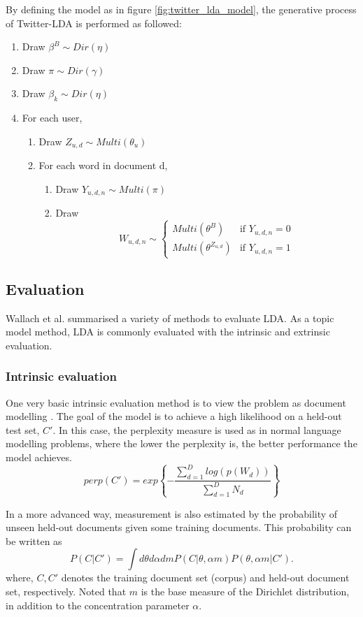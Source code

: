 \documentclass[11pt]{article}
\begin{document}
By defining the model as in figure \ref{fig:twitter_lda_model}, the generative process of Twitter-LDA is performed as followed:
\begin{enumerate}
	\item Draw $\beta^B \sim Dir(\eta)$
	\item Draw $\pi \sim Dir(\gamma)$
	\item Draw $\beta_k \sim Dir(\eta)$
	\item For each user,
	\begin{enumerate}
		\item Draw $Z_{u,d} \sim Multi(\theta_u)$
		\item For each word in document d,
		\begin{enumerate}
			\item Draw $Y_{u,d,n} \sim Multi(\pi)$
			\item Draw \[W_{u,d,n} \sim 
			\begin{cases}
			Multi(\theta^B) & \text{if $Y_{u,d,n} = 0$}\\
			Multi(\theta^{Z_{u,d}}) & \text{if $Y_{u,d,n} = 1$}
			\end{cases}\]
		\end{enumerate}
	\end{enumerate}
\end{enumerate}

\subsection{Evaluation} \label{evaluation}

Wallach et al. \cite{Wallach2009a} summarised a variety of methods to evaluate LDA. As a topic model method, LDA is commonly evaluated with the intrinsic and extrinsic evaluation. 

\subsubsection{Intrinsic evaluation}
One very basic intrinsic evaluation method is to view the problem as document modelling \cite{Blei2003}. The goal of the model is to achieve a high likelihood on a held-out test set, $C'$. In this case, the perplexity measure is used as in normal language modelling problems, where the lower the perplexity is, the better performance the model achieves.
\[perp(C')=exp\left\{-\frac{\sum_{d=1}^{D}{log(p(W_d))}}{\sum_{d=1}^{D}N_d}\right\}\]

In a more advanced way, measurement is also estimated by the probability of unseen held-out documents given some training documents. This probability can be written as
\cite{Wallach2009a}
\[P(C|C')=\int d\theta d\alpha dm P(C|\theta,\alpha m)P(\theta,\alpha m|C').\]
where, $C, C'$ denotes the training document set (corpus) and held-out document set, respectively. Noted that $m$ is the base measure of the Dirichlet distribution, in addition to the concentration parameter $\alpha$.
\end{document}
